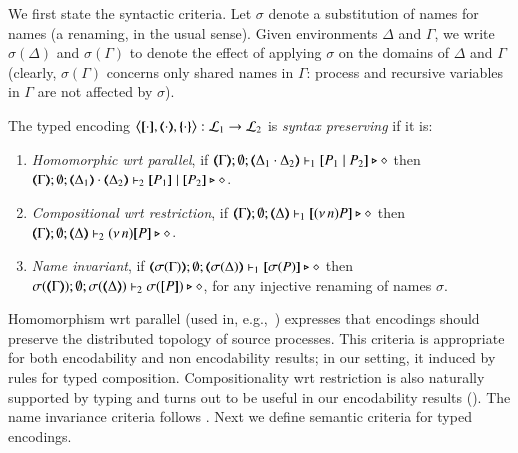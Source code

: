 We first state the 
syntactic criteria. 
Let $\sigma$ denote a substitution of names for names (a renaming, in the usual sense). Given environments $\Delta$ and $\Gamma$,
we write $\sigma(\Delta)$ and $\sigma(\Gamma)$ to denote the effect of applying $\sigma$ on the 
domains of $\Delta$ and $\Gamma$
(clearly, $\sigma(\Gamma)$ concerns only shared names in $\Gamma$: process and recursive variables in $\Gamma$ are not affected by $\sigma$). 

\smallskip 

\begin{definition}\rm
	\label{def:sep}
	The typed encoding 
	$\enco{\map{\cdot}, \mapt{\cdot}, \mapa{\cdot}}: \tyl{L}_1 \to \tyl{L}_2$ is \emph{syntax preserving}
	if it is:
	
	\begin{enumerate}[1.]
		\item	\emph{Homomorphic wrt parallel},   if 
		$\mapt{\Gamma}; \emptyset; \mapt{\Delta_1 \cat \Delta_2} \proves_1 \map{P_1 \Par P_2} \hastype \Proc$
		then 
		$\mapt{\Gamma}; \emptyset; \mapt{\Delta_1} \cat \mapt{\Delta_2} \proves_2 \map{P_1} \Par \map{P_2} \hastype \Proc$.

		\item	\emph{Compositional wrt restriction},  if 
		$\mapt{\Gamma}; \emptyset; \mapt{\Delta} \proves_1 \map{\news{n}P} \hastype \Proc$
		then 
		$\mapt{\Gamma}; \emptyset; \mapt{\Delta} \proves_2 \news{n}\map{P} \hastype \Proc$.
		
		\item \emph{Name invariant},   if
		$\mapt{\sigma(\Gamma)}; \emptyset; \mapt{\sigma(\Delta)} \proves_1 \map{\sigma(P)} \hastype \Proc$
		then \\
		$\sigma(\mapt{\Gamma}); \emptyset; \sigma(\mapt{\Delta}) \proves_2 \sigma(\map{P}) \hastype \Proc$, 
		for any injective renaming  of names $\sigma$.
	\end{enumerate}
\end{definition}

\smallskip 

\noi Homomorphism wrt parallel (used in, e.g.,~\cite{Palamidessi03,DBLP:conf/lics/PalamidessiSVV06})
expresses that encodings should preserve the distributed topology of source processes. This criteria 
 is appropriate for both encodability and non encodability results; in our setting, it 
induced by rules for typed composition.
Compositionality wrt restriction is 
also naturally supported by typing and turns out to be 
useful in our encodability results ().
The name invariance criteria follows \cite{DBLP:journals/iandc/Gorla10,DBLP:conf/icalp/LanesePSS10}. 
Next we define semantic criteria for typed encodings.

